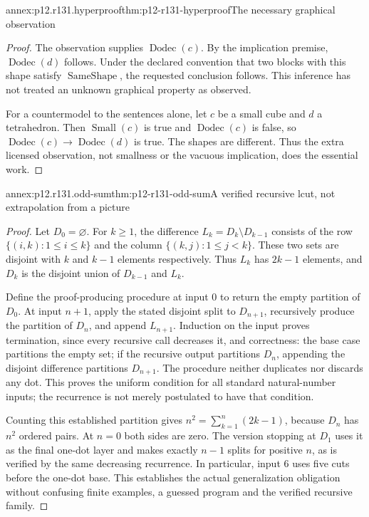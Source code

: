 \begin{annexitem}{annex:p12.r131.hyperproof}{thm:p12-r131-hyperproof}{The necessary graphical observation}
\begin{proof}
The observation supplies $\operatorname{Dodec}(c)$. By the implication
premise, $\operatorname{Dodec}(d)$ follows. Under the declared convention
that two blocks with this shape satisfy $\operatorname{SameShape}$,
the requested conclusion follows. This inference has not treated an
unknown graphical property as observed.

For a countermodel to the sentences alone, let $c$ be a small cube and
$d$ a tetrahedron. Then $\operatorname{Small}(c)$ is true and
$\operatorname{Dodec}(c)$ is false, so
$\operatorname{Dodec}(c)\to\operatorname{Dodec}(d)$ is true. The
shapes are different. Thus the extra licensed observation, not
smallness or the vacuous implication, does the essential work.
\end{proof}
\end{annexitem}

\begin{annexitem}{annex:p12.r131.odd-sum}{thm:p12-r131-odd-sum}{A verified recursive lcut, not extrapolation from a picture}
\begin{proof}
Let $D_0=\varnothing$. For $k\geq1$, the difference
$L_k=D_k\setminus D_{k-1}$ consists of the row
$\{(i,k):1\leq i\leq k\}$ and the column
$\{(k,j):1\leq j<k\}$. These two sets are disjoint with
$k$ and $k-1$ elements respectively. Thus $L_k$ has $2k-1$
elements, and $D_k$ is the disjoint union of $D_{k-1}$ and $L_k$.

Define the proof-producing procedure at input $0$ to return the empty
partition of $D_0$. At input $n+1$, apply the stated disjoint split
to $D_{n+1}$, recursively produce the partition of $D_n$, and append
$L_{n+1}$. Induction on the input proves termination, since every
recursive call decreases it, and correctness: the base case partitions
the empty set; if the recursive output partitions $D_n$, appending
the disjoint difference partitions $D_{n+1}$. The procedure neither
duplicates nor discards any dot. This proves the uniform condition
for all standard natural-number inputs; the recurrence is not merely
postulated to have that condition.

Counting this established partition gives
$n^2=\sum_{k=1}^{n}(2k-1)$, because $D_n$ has $n^2$ ordered
pairs. At $n=0$ both sides are zero. The version stopping at $D_1$
uses it as the final one-dot layer and makes exactly $n-1$ splits
for positive $n$, as is verified by the same decreasing recurrence.
In particular, input $6$ uses five cuts before the one-dot base. This
establishes the actual generalization obligation without confusing
finite examples, a guessed program and the verified recursive family.
\end{proof}
\end{annexitem}

